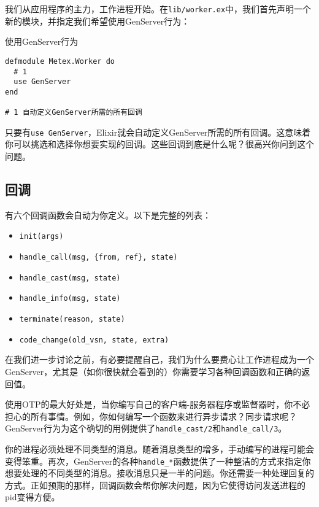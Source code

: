 我们从应用程序的主力，工作进程开始。在\texttt{lib/worker.ex}中，我们首先声明一个新的模块，并指定我们希望使用GenServer行为：

\begin{code}{使用GenServer行为}
\begin{verbatim}
defmodule Metex.Worker do
  # 1
  use GenServer
end

# 1 自动定义GenServer所需的所有回调
\end{verbatim}
\label{lst:use_genserver_behaviour}
\end{code}

只要有\texttt{use GenServer}，Elixir就会自动定义GenServer所需的所有回调。这意味着你可以挑选和选择你想要实现的回调。这些回调到底是什么呢？很高兴你问到这个问题。

 \subsection{ 回调}

有六个回调函数会自动为你定义。以下是完整的列表：

\begin{itemize}

\item  \texttt{init(args)}
\item  \texttt{handle\_call(msg, \{from, ref\}, state)}
\item  \texttt{handle\_cast(msg, state)}
\item  \texttt{handle\_info(msg, state)}
\item  \texttt{terminate(reason, state)}
\item  \texttt{code\_change(old\_vsn, state, extra)}
\end{itemize}

在我们进一步讨论之前，有必要提醒自己，我们为什么要费心让工作进程成为一个GenServer，尤其是（如你很快就会看到的）你需要学习各种回调函数和正确的返回值。

使用OTP的最大好处是，当你编写自己的客户端-服务器程序或监督器时，你不必担心的所有事情。例如，你如何编写一个函数来进行异步请求？同步请求呢？GenServer行为为这个确切的用例提供了\texttt{handle\_cast/2}和\texttt{handle\_call/3}。

你的进程必须处理不同类型的消息。随着消息类型的增多，手动编写的进程可能会变得笨重。再次，GenServer的各种\texttt{handle\_*}函数提供了一种整洁的方式来指定你想要处理的不同类型的消息。接收消息只是一半的问题。你还需要一种处理回复的方式。正如预期的那样，回调函数会帮你解决问题，因为它使得访问发送进程的pid变得方便。

